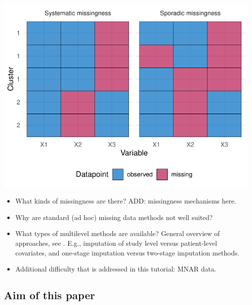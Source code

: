 \documentclass[
]{jss}
\begin{document}
\begin{CodeChunk}


\begin{center}\includegraphics{Manuscript_files/figure-latex/patterns-1} \end{center}

\end{CodeChunk}

\begin{itemize}
\item
  What kinds of missingness are there? ADD: missingness mechanisms here.
\item
  Why are standard (ad hoc) missing data methods not well suited?
\item
  What types of multilevel methods are available? General overview of
  approaches, see \citet{audi18} \citet{grun18}. E.g., imputation of
  study level versus patient-level covariates, and one-stage imputation
  versus two-stage imputation methods.
\item
  Additional difficulty that is addressed in this tutorial: MNAR data.
\end{itemize}

\hypertarget{aim-of-this-paper}{%
\subsection{Aim of this paper}\label{aim-of-this-paper}}
\end{document}
